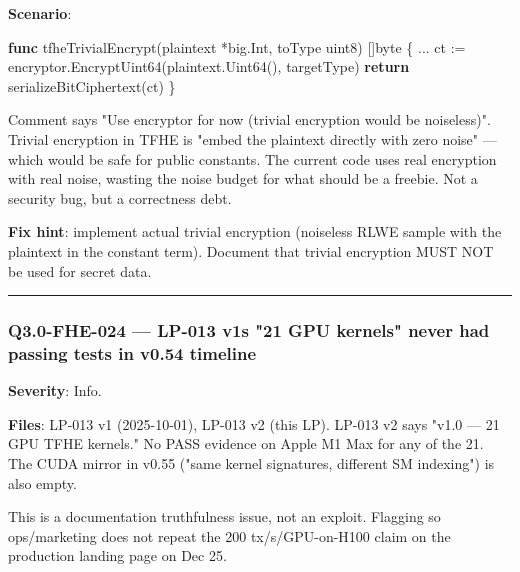\documentclass[
]{article}
\newenvironment{Shaded}{}{}
\newcommand{\ControlFlowTok}[1]{\textcolor[rgb]{0.00,0.44,0.13}{\textbf{#1}}}
\newcommand{\DataTypeTok}[1]{\textcolor[rgb]{0.56,0.13,0.00}{#1}}
\newcommand{\KeywordTok}[1]{\textcolor[rgb]{0.00,0.44,0.13}{\textbf{#1}}}
\newcommand{\NormalTok}[1]{#1}
\newcommand{\OperatorTok}[1]{\textcolor[rgb]{0.40,0.40,0.40}{#1}}
\begin{document}
\textbf{Scenario}:

\begin{Shaded}
\begin{Highlighting}[]
\KeywordTok{func}\NormalTok{ tfheTrivialEncrypt}\OperatorTok{(}\NormalTok{plaintext }\OperatorTok{*}\NormalTok{big}\OperatorTok{.}\NormalTok{Int}\OperatorTok{,}\NormalTok{ toType }\DataTypeTok{uint8}\OperatorTok{)} \OperatorTok{[]}\DataTypeTok{byte} \OperatorTok{\{}
    \OperatorTok{...}
\NormalTok{    ct }\OperatorTok{:=}\NormalTok{ encryptor}\OperatorTok{.}\NormalTok{EncryptUint64}\OperatorTok{(}\NormalTok{plaintext}\OperatorTok{.}\NormalTok{Uint64}\OperatorTok{(),}\NormalTok{ targetType}\OperatorTok{)}
    \ControlFlowTok{return}\NormalTok{ serializeBitCiphertext}\OperatorTok{(}\NormalTok{ct}\OperatorTok{)}
\OperatorTok{\}}
\end{Highlighting}
\end{Shaded}

Comment says "Use encryptor for now (trivial encryption would be
noiseless)". Trivial encryption in TFHE is "embed the plaintext directly
with zero noise" --- which would be safe for public constants. The
current code uses real encryption with real noise, wasting the noise
budget for what should be a freebie. Not a security bug, but a
correctness debt.

\textbf{Fix hint}: implement actual trivial encryption (noiseless RLWE
sample with the plaintext in the constant term). Document that trivial
encryption MUST NOT be used for secret data.

\begin{center}\rule{0.5\linewidth}{0.5pt}\end{center}

\subsubsection{Q3.0-FHE-024 --- LP-013 v1\textquotesingle s "21 GPU
kernels" never had passing tests in v0.54
timeline}\label{q30-fhe-024--lp-013-v1s-21-gpu-kernels-never-had-passing-tests-in-v054-timeline}

\textbf{Severity}: Info.

\textbf{Files}: LP-013 v1 (2025-10-01), LP-013 v2 (this LP). LP-013 v2
says "v1.0 --- 21 GPU TFHE kernels." No PASS evidence on Apple M1 Max
for any of the 21. The CUDA mirror in v0.55 ("same kernel signatures,
different SM indexing") is also empty.

This is a documentation truthfulness issue, not an exploit. Flagging so
ops/marketing does not repeat the 200 tx/s/GPU-on-H100 claim on the
production landing page on Dec 25.
\end{document}
